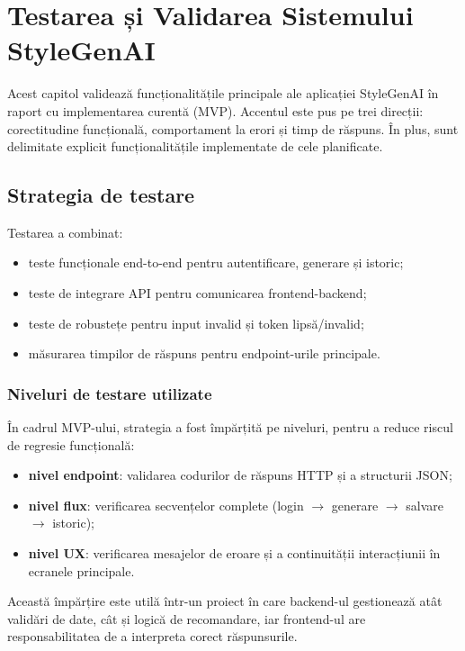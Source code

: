 \chapter{Testarea și Validarea Sistemului StyleGenAI}
\label{cap:testare}

Acest capitol validează funcționalitățile principale ale aplicației StyleGenAI în raport cu implementarea curentă (MVP). Accentul este pus pe trei direcții: corectitudine funcțională, comportament la erori și timp de răspuns. În plus, sunt delimitate explicit funcționalitățile implementate de cele planificate.

\section{Strategia de testare}
Testarea a combinat:
\begin{itemize}
    \item teste funcționale end-to-end pentru autentificare, generare și istoric;
    \item teste de integrare API pentru comunicarea frontend-backend;
    \item teste de robustețe pentru input invalid și token lipsă/invalid;
    \item măsurarea timpilor de răspuns pentru endpoint-urile principale.
\end{itemize}

\subsection{Niveluri de testare utilizate}
În cadrul MVP-ului, strategia a fost împărțită pe niveluri, pentru a reduce riscul de regresie funcțională:
\begin{itemize}
    \item \textbf{nivel endpoint}: validarea codurilor de răspuns HTTP și a structurii JSON;
    \item \textbf{nivel flux}: verificarea secvențelor complete (login $\rightarrow$ generare $\rightarrow$ salvare $\rightarrow$ istoric);
    \item \textbf{nivel UX}: verificarea mesajelor de eroare și a continuității interacțiunii în ecranele principale.
\end{itemize}

Această împărțire este utilă într-un proiect în care backend-ul gestionează atât validări de date, cât și logică de recomandare, iar frontend-ul are responsabilitatea de a interpreta corect răspunsurile.

